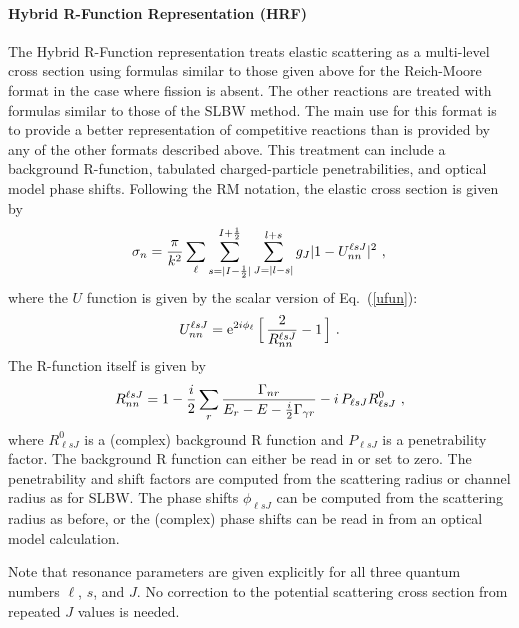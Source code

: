 \paragraph{Hybrid R-Function Representation (HRF)}
The Hybrid R-Function representation treats
elastic scattering as a multi-level
cross section using formulas similar to those given above
for the Reich-Moore format
in the case where fission is absent.  The other reactions are
treated with formulas similar to those of the SLBW method.  The main use for this format is to provide a better
representation of competitive reactions than is
provided by any of the other formats described above.  This
treatment can include a background R-function, tabulated
charged-particle penetrabilities, and optical model phase
shifts.  Following the RM notation, the elastic cross
section is given by
\begin{equation}
    \sigma_n={\frac{\pi}{k^2}}
    \sum_\ell \sum_{s=|I-\frac{1}{2}|}^{I+\frac{1}{2}}
    \sum_{J=|l-s|}^{l+s}
      g_J | 1-U_{nn}^{\ell sJ} |^2\,\,,\\
\end{equation}
where the $U$ function is given by the scalar version of
Eq.~(\ref{ufun}):
\begin{equation}
  U_{nn}^{\ell sJ}={\rm e}^{2i\phi_\ell}\,
    \Bigl[\,\frac{2}{R^{\ell sJ}_{nn}}-1\, \Bigr] \,\,.
\end{equation}
The R-function itself is given by
\begin{equation}
  R_{nn}^{\ell sJ}=1
    -{\frac{i}{2}}\sum_r {{\Gamma_{nr}}\over
    {E_r-E-{\frac{i}{2}}\Gamma_{\gamma r}}}
     -i\,P_{\ell sJ}R^0_{\ell sJ}\,\,,
\end{equation}
where $R^0_{\ell sJ}$ is a (complex) background R function and
$P_{\ell sJ}$ is a penetrability factor.  The background R
function can either be read in or set to zero.  The penetrability
and shift factors are computed from the scattering radius or
channel radius as for SLBW.  The phase
shifts $\phi_{\ell sJ}$ can be computed from the scattering radius
as before, or the (complex) phase shifts can be read in from
an optical model calculation.

Note that resonance parameters are given explicitly for all three
quantum numbers $\ell$, $s$, and $J$.  No correction to the
potential scattering cross section from repeated $J$ values is
needed.

